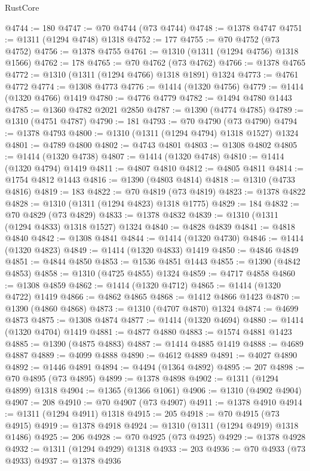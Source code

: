 \begin{lexlean}{RustCore}
\begin{coremodule}
@4744 := 180
@4747 := @70 @4744 (@73 @4744)
@4748 := @1378 @4747
@4751 := @1311 (@1294 @4748) @1318
@4752 := 177
@4755 := @70 @4752 (@73 @4752)
@4756 := @1378 @4755
@4761 := @1310 (@1311 (@1294 @4756) @1318 @1566)
@4762 := 178
@4765 := @70 @4762 (@73 @4762)
@4766 := @1378 @4765
@4772 := @1310 (@1311 (@1294 @4766) @1318 @1891) @1324
@4773 := @4761 @4772
@4774 := @1308 @4773
@4776 := @1414 (@1320 @4756)
@4779 := @1414 (@1320 @4766) @1419
@4780 := @4776 @4779
@4782 := @1494 @4780 @1443
@4785 := @1360 @4782 @2021 @2850
@4787 := @1390 (@4774 @4785)
@4789 := @1310 (@4751 @4787)
@4790 := 181
@4793 := @70 @4790 (@73 @4790)
@4794 := @1378 @4793
@4800 := @1310 (@1311 (@1294 @4794) @1318 @1527) @1324
@4801 := @4789 @4800
@4802 := @4743 @4801
@4803 := @1308 @4802
@4805 := @1414 (@1320 @4738)
@4807 := @1414 (@1320 @4748)
@4810 := @1414 (@1320 @4794) @1419
@4811 := @4807 @4810
@4812 := @4805 @4811
@4814 := @1754 @4812 @1443
@4816 := @1390 (@4803 @4814)
@4818 := @1310 (@4733 @4816)
@4819 := 183
@4822 := @70 @4819 (@73 @4819)
@4823 := @1378 @4822
@4828 := @1310 (@1311 (@1294 @4823) @1318 @1775)
@4829 := 184
@4832 := @70 @4829 (@73 @4829)
@4833 := @1378 @4832
@4839 := @1310 (@1311 (@1294 @4833) @1318 @1527) @1324
@4840 := @4828 @4839
@4841 := @4818 @4840
@4842 := @1308 @4841
@4844 := @1414 (@1320 @4730)
@4846 := @1414 (@1320 @4823)
@4849 := @1414 (@1320 @4833) @1419
@4850 := @4846 @4849
@4851 := @4844 @4850
@4853 := @1536 @4851 @1443
@4855 := @1390 (@4842 @4853)
@4858 := @1310 (@4725 @4855) @1324
@4859 := @4717 @4858
@4860 := @1308 @4859
@4862 := @1414 (@1320 @4712)
@4865 := @1414 (@1320 @4722) @1419
@4866 := @4862 @4865
@4868 := @1412 @4866 @1423
@4870 := @1390 (@4860 @4868)
@4873 := @1310 (@4707 @4870) @1324
@4874 := @4699 @4873
@4875 := @1308 @4874
@4877 := @1414 (@1320 @4694)
@4880 := @1414 (@1320 @4704) @1419
@4881 := @4877 @4880
@4883 := @1574 @4881 @1423
@4885 := @1390 (@4875 @4883)
@4887 := @1414 @4885 @1419
@4888 := @4689 @4887
@4889 := @4099 @4888
@4890 := @4612 @4889
@4891 := @4027 @4890
@4892 := @1446 @4891
@4894 := @4494 (@1364 @4892)
@4895 := 207
@4898 := @70 @4895 (@73 @4895)
@4899 := @1378 @4898
@4902 := @1311 (@1294 @4899) @1318
@4904 := @1365 (@1366 @1061)
@4906 := @1310 (@4902 @4904)
@4907 := 208
@4910 := @70 @4907 (@73 @4907)
@4911 := @1378 @4910
@4914 := @1311 (@1294 @4911) @1318
@4915 := 205
@4918 := @70 @4915 (@73 @4915)
@4919 := @1378 @4918
@4924 := @1310 (@1311 (@1294 @4919) @1318 @1486)
@4925 := 206
@4928 := @70 @4925 (@73 @4925)
@4929 := @1378 @4928
@4932 := @1311 (@1294 @4929) @1318
@4933 := 203
@4936 := @70 @4933 (@73 @4933)
@4937 := @1378 @4936

\end{coremodule}
\end{lexlean}
